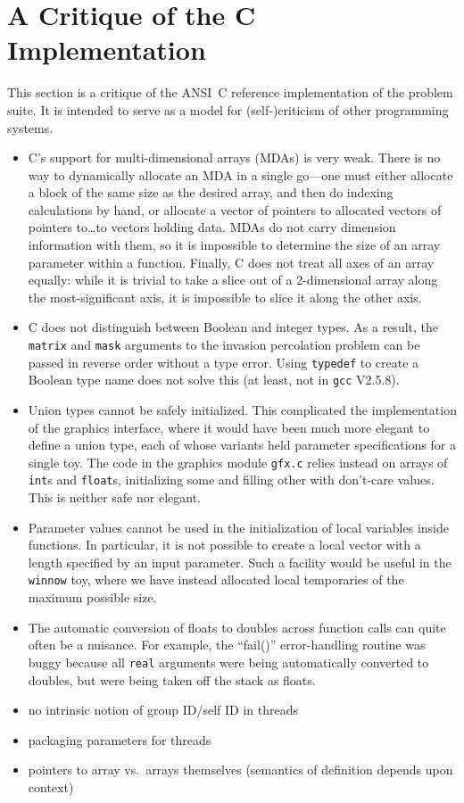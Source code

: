\newpage
\section{A Critique of the C Implementation\label{s:critique}}

This section is a critique of the ANSI~C reference implementation of the problem suite.
It is intended to serve as a model for (self-)criticism of other programming systems.

\begin{itemize}
\item	C's support for multi-dimensional arrays (MDAs) is very weak.
	There is no way to dynamically allocate an MDA in a single go---one must either
	allocate a block of the same size as the desired array,
	and then do indexing calculations by hand,
	or allocate a vector of pointers to allocated vectors of pointers to{\ldots}to vectors holding data.
	MDAs do not carry dimension information with them,
	so it is impossible to determine the size of an array parameter within a function.
	Finally,
	C does not treat all axes of an array equally:
	while it is trivial to take a slice out of a 2-dimensional array along the most-significant axis,
	it is impossible to slice it along the other axis.
\item	C does not distinguish between Boolean and integer types.
	As a result,
	the {\tt{matrix}} and {\tt{mask}} arguments to the invasion percolation problem
	can be passed in reverse order without a type error.
	Using {\tt{typedef}} to create a Boolean type name does not solve this
	(at least, not in {\tt{gcc}} V2.5.8).
\item	Union types cannot be safely initialized.
	This complicated the implementation of the graphics interface,
	where it would have been much more elegant to define a union type,
	each of whose variants held parameter specifications for a single toy.
	The code in the graphics module {\tt{gfx.c}} relies instead on arrays of {\tt{int}}s and {\tt{float}}s,
	initializing some and filling other with don't-care values.
	This is neither safe nor elegant.
\item	Parameter values cannot be used in the initialization of local variables inside functions.
	In particular,
	it is not possible to create a local vector with a length specified by an input parameter.
	Such a facility would be useful in the {\tt{winnow}} toy,
	where we have instead allocated local temporaries of the maximum possible size.
\item	The automatic conversion of floats to doubles across function calls can quite often be a nuisance.
	For example, the ``fail()'' error-handling routine was buggy because
	all \verb`real` arguments were being automatically converted to doubles,
	but were being taken off the stack as floats.
\item	no intrinsic notion of group ID/self ID in threads
\item	packaging parameters for threads
\item	pointers to array vs.\ arrays themselves (semantics of definition depends upon context)
\end{itemize}


